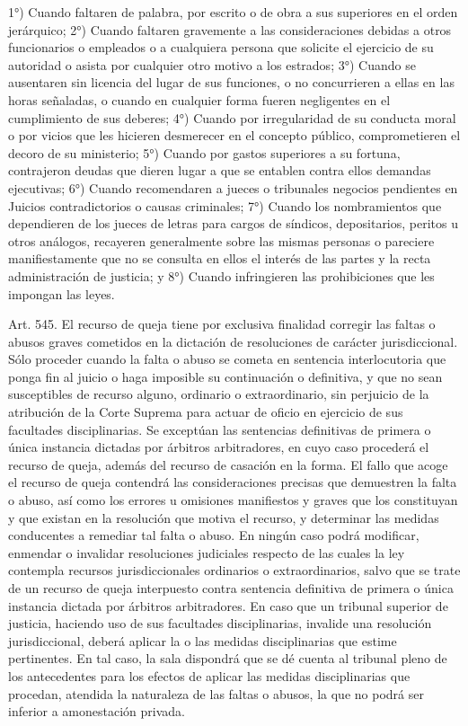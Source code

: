     1°) Cuando faltaren de palabra, por escrito o de obra a sus superiores en el orden jerárquico;
    2°) Cuando faltaren gravemente a las consideraciones debidas a otros funcionarios o empleados o a cualquiera persona que solicite el ejercicio de su autoridad o asista por cualquier otro motivo a los estrados;
    3°) Cuando se ausentaren sin licencia del lugar de sus funciones, o no concurrieren a ellas en las horas señaladas, o cuando en cualquier forma fueren negligentes en el cumplimiento de sus deberes;
    4°) Cuando por irregularidad de su conducta moral o por vicios que les hicieren desmerecer en el concepto público, comprometieren el decoro de su ministerio;
    5°) Cuando por gastos superiores a su fortuna, contrajeron deudas que dieren lugar a que se entablen contra ellos demandas ejecutivas;
    6°) Cuando recomendaren a jueces o tribunales negocios pendientes en Juicios contradictorios o causas criminales;
    7°) Cuando los nombramientos que dependieren de los jueces de letras para cargos de síndicos, depositarios, peritos u otros análogos, recayeren generalmente sobre las mismas personas o pareciere manifiestamente que no se consulta en ellos el interés de las partes y la recta administración de justicia; y
    8°) Cuando infringieren las prohibiciones que les impongan las leyes.

    Art. 545. El recurso de queja tiene por exclusiva finalidad corregir las faltas o abusos graves cometidos en la dictación de resoluciones de carácter jurisdiccional. Sólo proceder cuando la falta o abuso se cometa en sentencia interlocutoria que ponga fin al juicio o haga imposible su continuación o definitiva, y que no sean susceptibles de recurso alguno, ordinario o extraordinario, sin perjuicio de la atribución de la Corte Suprema para actuar de oficio en ejercicio de sus facultades disciplinarias. Se exceptúan las sentencias definitivas de primera o única instancia dictadas por árbitros arbitradores, en cuyo caso procederá el recurso de queja, además del recurso de casación en la forma.
    El fallo que acoge el recurso de queja contendrá las consideraciones precisas que demuestren la falta o abuso, así como los errores u omisiones manifiestos y graves que los constituyan y que existan en la resolución que motiva el recurso, y determinar las medidas conducentes a remediar tal falta o abuso. En ningún caso podrá modificar, enmendar o invalidar resoluciones judiciales respecto de las cuales la ley contempla recursos jurisdiccionales ordinarios o extraordinarios, salvo que se trate de un recurso de queja interpuesto contra sentencia definitiva de primera o única instancia dictada por árbitros arbitradores.
    En caso que un tribunal superior de justicia, haciendo uso de sus facultades disciplinarias, invalide una resolución jurisdiccional, deberá aplicar la o las medidas disciplinarias que estime pertinentes. En tal caso, la sala dispondrá que se dé cuenta al tribunal pleno de los antecedentes para los efectos de aplicar las medidas disciplinarias que procedan, atendida la naturaleza de las faltas o abusos, la que no podrá ser inferior a amonestación privada.


